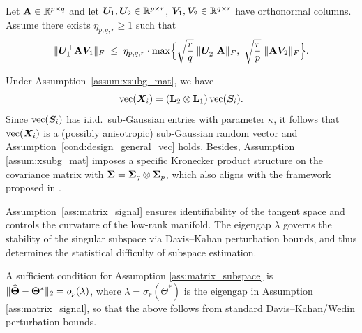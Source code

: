 \documentclass[authoryear,preprint,review,12pt]{elsarticle}
\begin{document}
	\begin{assumption}
		\label{ass:alignment_matrix_dim}
		Let $\bar{\mathbf{A}}\in\mathbb{R}^{p\times q}$ and let $\boldsymbol U_1,\boldsymbol U_2\in\mathbb{R}^{p\times r}$,
		$\boldsymbol V_1,\boldsymbol V_2\in\mathbb{R}^{q\times r}$ have orthonormal columns.
		Assume there exists $\eta_{p,q,r}\ge 1$ such that
		\begin{equation}
			\label{eq:alignment_matrix_dim}
			\|\bU_1^{\top}\bar{\bA}\bV_1\|_F
			\;\le\;
			\eta_{p,q,r}\cdot
			\max\Bigl\{
			\sqrt{\frac{r}{q}}\;\|\bU_2^{\top}\bar{\bA}\|_F,\ 
			\sqrt{\frac{r}{p}}\;\|\bar{\bA}\bV_2\|_F
			\Bigr\}.
		\end{equation}
	\end{assumption} 
	Under Assumption~\ref{assum:xsubg_mat}, we have
	\[
	\mathrm{vec}(\boldsymbol X_i) = (\mathbf{L}_2 \otimes \mathbf{L}_1)\,\mathrm{vec}(\boldsymbol S_i).
	\]
	Since $\mathrm{vec}(\boldsymbol S_i)$ has i.i.d.\ sub-Gaussian entries with parameter $\kappa$, it follows that
	$\mathrm{vec}(\boldsymbol X_i)$ is a (possibly anisotropic) sub-Gaussian random vector and 
	Assumption~\ref{cond:design_general_vec}  holds.
	Besides, Assumption \ref{assum:xsubg_mat} imposes a specific Kronecker product structure on the covariance matrix with $\mathbf{ \Sigma}  = \mathbf{ \Sigma}_q\otimes \mathbf{ \Sigma}_p$, which also aligns with the framework proposed in \citet{Leng2018}.
	
	\begin{remark}
		Assumption~\ref{ass:matrix_signal} ensures identifiability of the tangent space 
		and controls the curvature of the low-rank manifold. 
		The eigengap $\lambda$ governs the stability of the singular subspace 
		via Davis--Kahan perturbation bounds, and thus determines the statistical 
		difficulty of subspace estimation.
	\end{remark}
	
	\begin{remark}
		A sufficient condition for Assumption \ref{ass:matrix_subspace} is $\|\widehat{\mathbf{\Theta}}-\mathbf{\Theta}^\ast\|_2=o_p(\lambda)$, where $\lambda=\sigma_r(\Theta^*)$
		is the eigengap in Assumption \ref{ass:matrix_signal}, so that the above follows from standard Davis--Kahan/Wedin perturbation bounds.
	\end{remark}
	 
\end{document}
